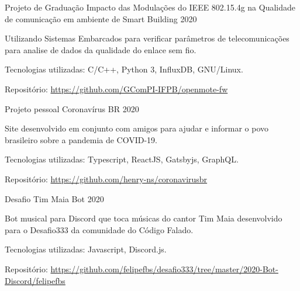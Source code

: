 
\begin{cventries}
  \cventry
  {Projeto de Graduação} %
  {Impacto das Modulações do IEEE 802.15.4g na Qualidade de comunicação em ambiente de Smart Building} %
  {} %
  {2020} %
  {
    \begin{cvitems} %
      \item {Utilizando Sistemas Embarcados para verificar parâmetros de telecomunicações para analise de dados da qualidade do enlace sem fio.}
      \item {Tecnologias utilizadas: C/C++, Python 3, InfluxDB, GNU/Linux.}
      \item {Repositório: \url{https://github.com/GComPI-IFPB/openmote-fw}}
    \end{cvitems}
  }


  \cventry
  {Projeto pessoal} %
  {Coronavírus BR} %
  {} %
  {2020} %
  {
    \begin{cvitems} %
      \item {Site desenvolvido em conjunto com amigos para ajudar e informar o povo brasileiro sobre a pandemia de COVID-19.}
      \item {Tecnologias utilizadas: Typescript, ReactJS, Gatsbyjs, GraphQL.}
      \item {Repositório: \url{https://github.com/henry-ns/coronavirusbr}}
    \end{cvitems}
  }

  \cventry
  {Desafio} %
  {Tim Maia Bot} %
  {} %
  {2020} %
  {
    \begin{cvitems} %
      \item {Bot musical para Discord que toca músicas do cantor Tim Maia desenvolvido para o Desafio333 da comunidade do Código Falado.}
      \item {Tecnologias utilizadas: Javascript, Discord.js.}
      \item {Repositório: \url{https://github.com/felipefbs/desafio333/tree/master/2020-Bot-Discord/felipefbs}}
    \end{cvitems}
  }


\end{cventries}
